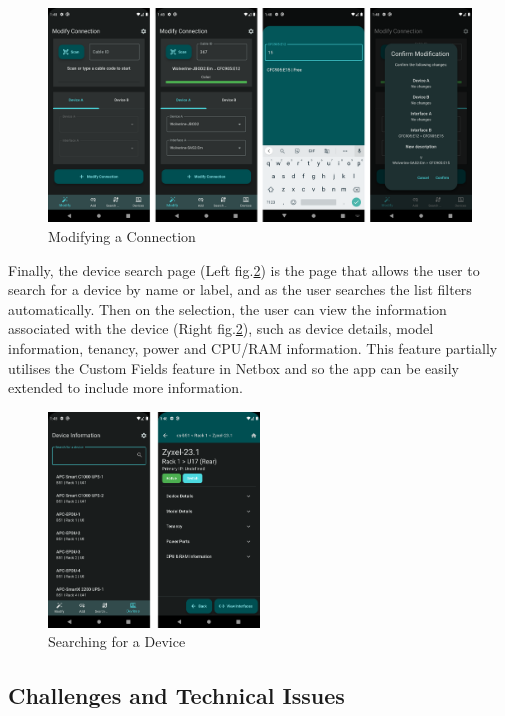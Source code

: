 \documentclass [11pt,a4paper]{article}
\begin{document}
\begin{figure}[H]
    \centering
    \includegraphics[width=\textwidth]{images/final_modify.png}
    \caption{Modifying a Connection}
    \label{fig:modify_connection}
\end{figure}

Finally, the device search page (Left fig.\ref{fig:device_searhc_and_view}) is the page that allows the user to search for a device by name or label, and as the user searches the list filters automatically. Then on the selection, the user can view the information associated with the device (Right fig.\ref{fig:device_searhc_and_view}), such as device details, model information, tenancy, power and CPU/RAM information. This feature partially utilises the Custom Fields feature in Netbox and so the app can be easily extended to include more information.

\begin{figure}[H]
    \centering
    \includegraphics[width=0.5\textwidth]{images/final_device.png}
    \caption{Searching for a Device}
    \label{fig:device_searhc_and_view}
\end{figure}

\subsection{Challenges and Technical Issues}
\label{sec:challenges}
\end{document}
